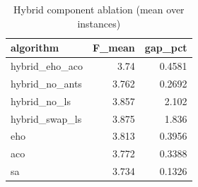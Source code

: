 \begin{table}
\caption{Hybrid component ablation (mean over instances)}
\begin{tabular}{lrr}
\toprule
algorithm & F_mean & gap_pct \\
\midrule
hybrid_eho_aco & 3.74 & 0.4581 \\
hybrid_no_ants & 3.762 & 0.2692 \\
hybrid_no_ls & 3.857 & 2.102 \\
hybrid_swap_ls & 3.875 & 1.836 \\
eho & 3.813 & 0.3956 \\
aco & 3.772 & 0.3388 \\
sa & 3.734 & 0.1326 \\
\bottomrule
\end{tabular}
\end{table}
